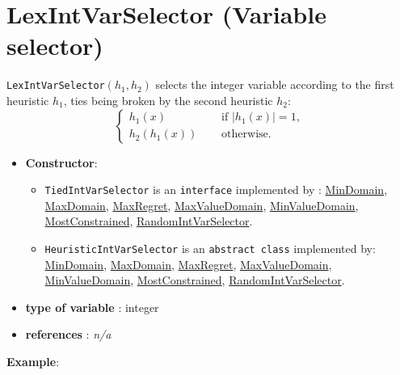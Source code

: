 \section{LexIntVarSelector (Variable selector)}\label{lexintvarselector:lexintvarselectorvarselector}\hypertarget{lexintvarselector:lexintvarselectorvarselector}{}
\begin{notedef}
  \texttt{LexIntVarSelector}$(h_1,h_2)$ selects the integer variable according to the first heuristic $h_1$, ties being broken by the second heuristic $h_2$:
$$\begin{cases}
  h_1(x) &\quad\text{ if } |h_1(x)|=1,\\
  h_2(h_1(x)) &\quad\text{ otherwise}.
\end{cases}$$
\end{notedef}

\begin{itemize}
	\item \textbf{Constructor}: 
	\begin{itemize}
\item \texttt{TiedIntVarSelector} is an \texttt{interface} implemented by : \hyperlink{mindomain:mindomainvarselector}{MinDomain}, \hyperlink{maxdomain:maxdomainvarselector}{MaxDomain}, \hyperlink{maxregret:maxregretvarselector}{MaxRegret}, \hyperlink{maxvaldomain:maxvaldomainvarselector}{MaxValueDomain}, \hyperlink{minvaldomain:minvaldomainvarselector}{MinValueDomain}, \hyperlink{mostconstrained:mostconstrainedvarselector}{MostConstrained}, \hyperlink{randomvarint:randomvarintvarselector}{RandomIntVarSelector}.
\item \texttt{HeuristicIntVarSelector} is an \texttt{abstract class}  implemented by: \hyperlink{mindomain:mindomainvarselector}{MinDomain}, \hyperlink{maxdomain:maxdomainvarselector}{MaxDomain}, \hyperlink{maxregret:maxregretvarselector}{MaxRegret}, \hyperlink{maxvaldomain:maxvaldomainvarselector}{MaxValueDomain}, \hyperlink{minvaldomain:minvaldomainvarselector}{MinValueDomain}, \hyperlink{mostconstrained:mostconstrainedvarselector}{MostConstrained}, \hyperlink{randomvarint:randomvarintvarselector}{RandomIntVarSelector}.
\end{itemize}
	\item \textbf{type of variable} : integer
	\item \textbf{references} : \emph{n/a}
\end{itemize}

\textbf{Example}:
%

